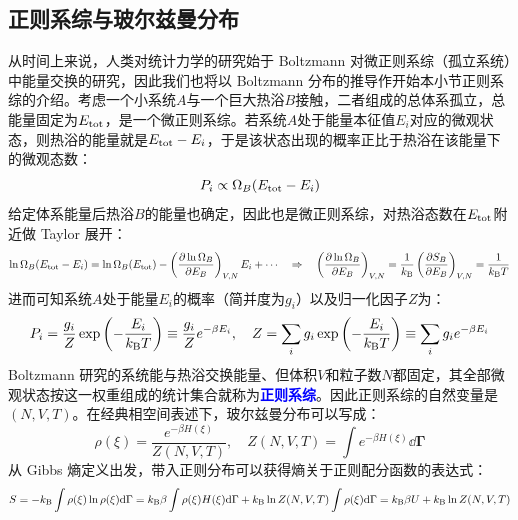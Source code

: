 \newpage
\subsection{正则系综与玻尔兹曼分布}
从时间上来说，人类对统计力学的研究始于 Boltzmann 对微正则系综（孤立系统）中能量交换的研究，因此我们也将以 Boltzmann 分布的推导作开始本小节正则系综的介绍。考虑一个小系统$A$与一个巨大热浴$B$接触，二者组成的总体系孤立，总能量固定为$E_{\rm tot}$，是一个微正则系综。若系统$A$处于能量本征值$E_i$对应的微观状态，则热浴的能量就是$E_{\rm tot}-E_i$，于是该状态出现的概率正比于热浴在该能量下的微观态数：
\[P_i\propto \Omega_B(E_{\rm tot}-E_i)\]
给定体系能量后热浴$B$的能量也确定，因此也是微正则系综，对热浴态数在$E_{\rm tot}$附近做 Taylor 展开：
\[\ln \Omega_B(E_{\rm tot}-E_i)=\ln \Omega_B(E_{\rm tot})-\left(\pdv{\ln\Omega_B}{E_B}\right)_{V,N}E_i+\cdots \quad \Rightarrow \quad \left(\pdv{\ln\Omega_B}{E_B}\right)_{V,N}=\frac{1}{k_{\rm B}}\left(\pdv{S_B}{E_B}\right)_{V,N}=\frac{1}{k_{\rm B} T}\]
进而可知系统$A$处于能量$E_i$的概率（简并度为$g_i$）以及归一化因子$Z$为：
\[P_i=\frac{g_i}{Z}\exp\left(-\frac{E_i}{k_{\rm B} T}\right)\equiv\frac{g_i}{Z}e^{-\beta E_i}, \quad Z=\sum_i g_i\exp\left(-\frac{E_i}{k_{\rm B} T}\right)\equiv\sum_i g_i e^{-\beta E_i}\]
Boltzmann 研究的系统能与热浴交换能量、但体积$V$和粒子数$N$都固定，其全部微观状态按这一权重组成的统计集合就称为\textcolor{blue}{\textbf{正则系综}}。因此正则系综的自然变量是$(N,V,T)$。在经典相空间表述下，玻尔兹曼分布可以写成：
\[\rho(\xi)=\frac{e^{-\beta H(\xi)}}{Z(N,V,T)},\quad Z(N,V,T)=\int e^{-\beta H(\xi)}\dd\bm{\Gamma}\]
从 Gibbs 熵定义出发，带入正则分布可以获得熵关于正则配分函数的表达式：
\[S=-k_{\rm B}\int \rho(\xi)\ln\rho(\xi)\dd\Gamma=k_{\rm B}\beta\int \rho(\xi)H(\xi)\dd\Gamma+k_{\rm B}\ln Z(N,V,T)\int \rho(\xi)\dd\Gamma=k_{\rm B}\beta U+k_{\rm B}\ln Z(N,V,T)\]

